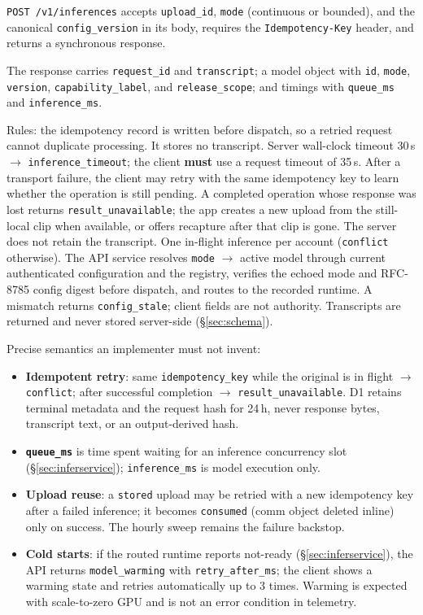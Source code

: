 \documentclass[11pt]{article}
\newcommand{\code}[1]{\texttt{#1}}
\begin{document}
\code{POST /v1/inferences} accepts \code{upload\_id}, \code{mode}
(continuous or bounded), and the canonical \code{config\_version} in its body,
requires the \code{Idempotency-Key} header, and returns a synchronous response.

The response carries \code{request\_id} and \code{transcript}; a model object with
\code{id}, \code{mode}, \code{version}, \code{capability\_label}, and
\code{release\_scope}; and timings with \code{queue\_ms} and
\code{inference\_ms}.

Rules: the idempotency record is written before dispatch, so a retried request
cannot duplicate processing. It stores no transcript. Server wall-clock timeout 30\,s $\to$
\code{inference\_timeout}; the client \textbf{must} use a request timeout of 35\,s.
After a transport failure, the client may retry with the same idempotency key to
learn whether the operation is still pending. A completed operation whose response
was lost returns \code{result\_unavailable}; the app creates a new upload from the
still-local clip when available, or offers recapture after that clip is gone. The
server does not retain the transcript. One in-flight inference per account
(\code{conflict} otherwise). The API service resolves \code{mode} $\to$ active
model through current authenticated configuration and the registry, verifies the
echoed mode and RFC-8785 config digest before dispatch, and routes to the recorded
runtime. A mismatch returns \code{config\_stale}; client fields are not authority. Transcripts are
returned and never stored server-side (\S\ref{sec:schema}).

Precise semantics an implementer must not invent:

\begin{itemize}[nosep]
  \item \textbf{Idempotent retry}: same \code{idempotency\_key} while the
        original is in flight $\to$ \code{conflict}; after successful completion
        $\to$ \code{result\_unavailable}. D1 retains terminal metadata and the
        request hash for 24\,h, never response bytes, transcript text, or an
        output-derived hash.
  \item \textbf{\code{queue\_ms}} is time spent waiting for an inference
        concurrency slot (\S\ref{sec:inferservice}); \code{inference\_ms} is model
        execution only.
  \item \textbf{Upload reuse}: a \code{stored} upload may be retried with a new
        idempotency key after a failed inference; it becomes \code{consumed}
        (comm object deleted inline) only on success. The hourly sweep remains
        the failure backstop.
  \item \textbf{Cold starts}: if the routed runtime reports not-ready
        (\S\ref{sec:inferservice}), the API returns \code{model\_warming} with
        \code{retry\_after\_ms}; the client shows a warming state and retries
        automatically up to 3 times. Warming is expected with scale-to-zero GPU
        and is not an error condition in telemetry.
\end{itemize}
\end{document}
